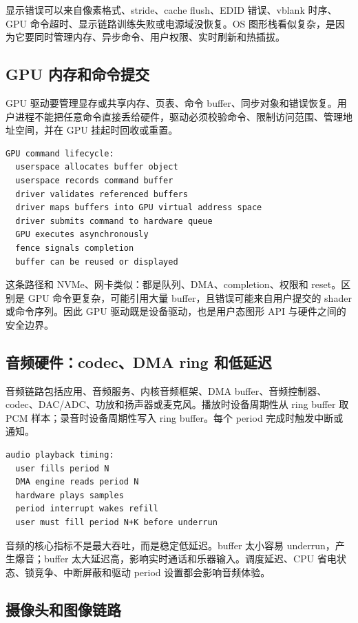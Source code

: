 显示错误可以来自像素格式、stride、cache flush、EDID 错误、vblank 时序、GPU 命令超时、显示链路训练失败或电源域没恢复。OS 图形栈看似复杂，是因为它要同时管理内存、异步命令、用户权限、实时刷新和热插拔。

\subsection{GPU 内存和命令提交}

GPU 驱动要管理显存或共享内存、页表、命令 buffer、同步对象和错误恢复。用户进程不能把任意命令直接丢给硬件，驱动必须校验命令、限制访问范围、管理地址空间，并在 GPU 挂起时回收或重置。

\begin{lstlisting}
GPU command lifecycle:
  userspace allocates buffer object
  userspace records command buffer
  driver validates referenced buffers
  driver maps buffers into GPU virtual address space
  driver submits command to hardware queue
  GPU executes asynchronously
  fence signals completion
  buffer can be reused or displayed
\end{lstlisting}

这条路径和 NVMe、网卡类似：都是队列、DMA、completion、权限和 reset。区别是 GPU 命令更复杂，可能引用大量 buffer，且错误可能来自用户提交的 shader 或命令序列。因此 GPU 驱动既是设备驱动，也是用户态图形 API 与硬件之间的安全边界。

\subsection{音频硬件：codec、DMA ring 和低延迟}

音频链路包括应用、音频服务、内核音频框架、DMA buffer、音频控制器、codec、DAC/ADC、功放和扬声器或麦克风。播放时设备周期性从 ring buffer 取 PCM 样本；录音时设备周期性写入 ring buffer。每个 period 完成时触发中断或通知。

\begin{lstlisting}
audio playback timing:
  user fills period N
  DMA engine reads period N
  hardware plays samples
  period interrupt wakes refill
  user must fill period N+K before underrun
\end{lstlisting}

音频的核心指标不是最大吞吐，而是稳定低延迟。buffer 太小容易 underrun，产生爆音；buffer 太大延迟高，影响实时通话和乐器输入。调度延迟、CPU 省电状态、锁竞争、中断屏蔽和驱动 period 设置都会影响音频体验。

\subsection{摄像头和图像链路}

